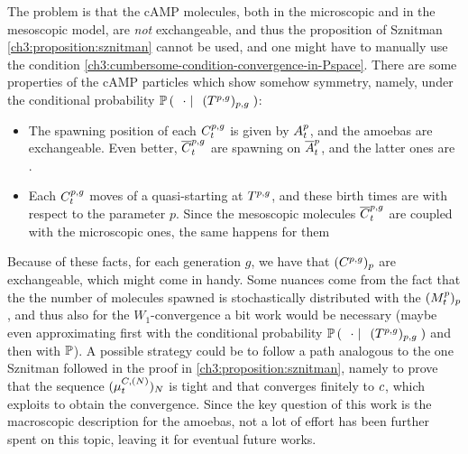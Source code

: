 The problem is that the cAMP molecules, both in the microscopic and in the mesoscopic model, are \emph{not} exchangeable, and thus the proposition of Sznitman \ref{ch3:proposition:sznitman} cannot be used, and one might have to manually use the condition \ref{ch3:cumbersome-condition-convergence-in-Pspace}.
There are some properties of the cAMP particles which show somehow symmetry, namely, under the conditional probability $\mathbb{P} \left( \; \left. \; \cdot \; \right| \; \;(T^{p,g})_{p,g}  \; \right)$:
\begin{itemize}
	\item The spawning position of each $C_t^{p,g}$ is given by $A_t^p$, and the amoebas are exchangeable.
	Even better, $\overline{C}_t^{p,g}$ are spawning on $\overline{A}_t^p$, and the latter ones are \iid.
	\item Each $C_t^{p,g}$ moves of a quasi-\Bm starting at $T^{p,g}$, and these birth times are \iid with respect to the parameter $p$. Since the mesoscopic molecules $\overline{C}_t^{p,g}$ are coupled with the microscopic ones, the same happens for them 
\end{itemize}
Because of these facts, for each generation $g$, we have that $(C^{p,g})_p$ are exchangeable, which might come in handy.
Some nuances come from the fact that the the number of molecules spawned is stochastically distributed with the \rv $(M_t^p)_p$, and thus also for the $W_1$-convergence a bit work would be necessary (maybe even approximating first with the conditional probability $\mathbb{P} \left( \; \left. \; \cdot \; \right| \; \;(T^{p,g})_{p,g}  \; \right)$ and then with $\mathbb{P}$).
A possible strategy could be to follow a path analogous to the one Sznitman followed in the proof in \ref{ch3:proposition:sznitman}, namely to prove that the sequence $ (\mu_t^{C,(N)} )_N$ is tight and that converges finitely to $c$, which exploits \cite[Theorem 5.1, Corollary]{billingsley} to obtain the convergence.
Since the key question of this work is the macroscopic description for the amoebas, not a lot of effort has been further spent on this topic, leaving it for eventual future works.

